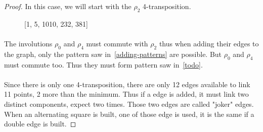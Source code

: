 \begin{proof}
  In this case, we will start with the $\rho_2$ 4-transposition.

  \begin{figure}[H]
    \begin{center}
      \caption{[1, 5, 1010, 232, 381]}
    \end{center}
  \end{figure}

\paragraph{}
The involutions $\rho_0$ and $\rho_4$ must commute with $\rho_2$ thus when adding their edges to the graph, only the pattern saw in~\ref{adding-patterns} are possible. But $\rho_0$ and $\rho_4$ must commute too. Thus they must form pattern saw in~\ref{todo}.

\paragraph{}
Since there is only one 4-transposition, there are only 12 edges available to link 11 points, 2 more than the minimum. Thus if a edge is added, it must link two distinct components, expect two times. Those two edges are called "joker" edges. When an alternating square is built, one of those edge is used, it is the same if a double edge is built.


\end{proof}
